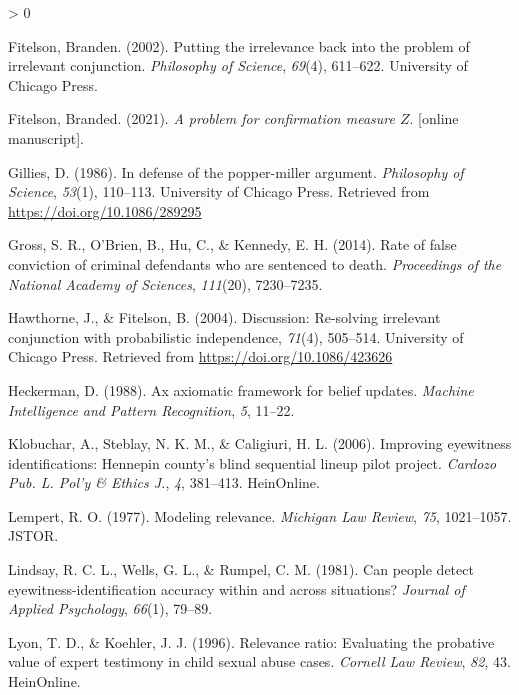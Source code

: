 \documentclass[
  10pt,
  dvipsnames,enabledeprecatedfontcommands]{scrartcl}
\newlength{\cslhangindent}
\newenvironment{CSLReferences}[2] %
 {%
  \setlength{\parindent}{0pt}
  \ifodd #1 \everypar{\setlength{\hangindent}{\cslhangindent}}\ignorespaces\fi
  \ifnum #2 > 0
  \setlength{\parskip}{#2\baselineskip}
  \fi
 }%
 {}
\begin{document}
\begin{CSLReferences}{1}{0}
\leavevmode\hypertarget{ref-Fitelson2002irrelevance}{}%
Fitelson, Branden. (2002). Putting the irrelevance back into the problem
of irrelevant conjunction. \emph{Philosophy of Science}, \emph{69}(4),
611--622. University of Chicago Press.

\leavevmode\hypertarget{ref-Fitelson2021z_measure}{}%
Fitelson, Branded. (2021). \emph{A problem for confirmation measure
\(Z\)}. {[}online manuscript{]}.

\leavevmode\hypertarget{ref-Gillies1986defense}{}%
Gillies, D. (1986). In defense of the popper-miller argument.
\emph{Philosophy of Science}, \emph{53}(1), 110--113. University of
Chicago Press. Retrieved from \url{https://doi.org/10.1086/289295}

\leavevmode\hypertarget{ref-gross2014RateFalseConviction}{}%
Gross, S. R., O'Brien, B., Hu, C., \& Kennedy, E. H. (2014). Rate of
false conviction of criminal defendants who are sentenced to death.
\emph{Proceedings of the National Academy of Sciences}, \emph{111}(20),
7230--7235.

\leavevmode\hypertarget{ref-HawthorneFitelson2004re-solving}{}%
Hawthorne, J., \& Fitelson, B. (2004). Discussion: Re-solving irrelevant
conjunction with probabilistic independence, \emph{71}(4), 505--514.
University of Chicago Press. Retrieved from
\url{https://doi.org/10.1086/423626}

\leavevmode\hypertarget{ref-Heckerman1988axiomatic}{}%
Heckerman, D. (1988). Ax axiomatic framework for belief updates.
\emph{Machine Intelligence and Pattern Recognition}, \emph{5}, 11--22.

\leavevmode\hypertarget{ref-klobuchar2006improving}{}%
Klobuchar, A., Steblay, N. K. M., \& Caligiuri, H. L. (2006). Improving
eyewitness identifications: Hennepin county's blind sequential lineup
pilot project. \emph{Cardozo Pub. L. Pol'y \& Ethics J.}, \emph{4},
381--413. HeinOnline.

\leavevmode\hypertarget{ref-lempert1977modeling}{}%
Lempert, R. O. (1977). Modeling relevance. \emph{Michigan Law Review},
\emph{75}, 1021--1057. JSTOR.

\leavevmode\hypertarget{ref-Lindsay1981CanPeopleDetect}{}%
Lindsay, R. C. L., Wells, G. L., \& Rumpel, C. M. (1981). Can people
detect eyewitness-identification accuracy within and across situations?
\emph{Journal of Applied Psychology}, \emph{66}(1), 79--89.

\leavevmode\hypertarget{ref-lyon1996relevance}{}%
Lyon, T. D., \& Koehler, J. J. (1996). Relevance ratio: Evaluating the
probative value of expert testimony in child sexual abuse cases.
\emph{Cornell Law Review}, \emph{82}, 43. HeinOnline.


\end{CSLReferences}
\end{document}
